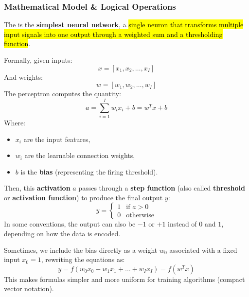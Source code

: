 \subsubsection{Mathematical Model \& Logical Operations}

The  is the \textbf{simplest neural network}, a \hl{single neuron that transforms multiple input signals into one output through a weighted sum and a thresholding function}.

\highspace
Formally, given inputs:
\begin{equation*}
    x = \left[x_{1}, x_{2}, \ldots, x_{I}\right]
\end{equation*}
And weights:
\begin{equation*}
    w = \left[w_{1}, w_{2}, \ldots, w_{I}\right]
\end{equation*}
The perceptron computes the quantity:
\begin{equation}\label{eq:perceptron-activation}
    a = \sum_{i=1}^{I} w_{i} x_{i} + b = w^{T} x + b
\end{equation}
Where:
\begin{itemize}
    \item $x_{i}$ are the input features,
    \item $w_{i}$ are the learnable connection weights,
    \item $b$ is the \textbf{bias} (representing the firing threshold).
\end{itemize}
Then, this \textbf{activation} $a$ passes through a \textbf{step function} (also called \textbf{threshold} or \textbf{activation function}) to produce the final output $y$:
\begin{equation}
    y =
    \begin{cases}
        1 & \text{if } a > 0 \\
        0 & \text{otherwise}
    \end{cases}
\end{equation}
In some conventions, the output can also be $-1$ or $+1$ instead of $0$ and $1$, depending on how the data is encoded.

\highspace
Sometimes, we include the bias directly as a weight $w_{0}$ associated with a fixed input $x_{0} = 1$, rewriting the equations as:
\begin{equation}
    y = f\left(w_0 x_0 + w_1 x_1 + \ldots + w_I x_I\right) = f\left(w^T x\right)
\end{equation}
This makes formulas simpler and more uniform for training algorithms (compact vector notation).


